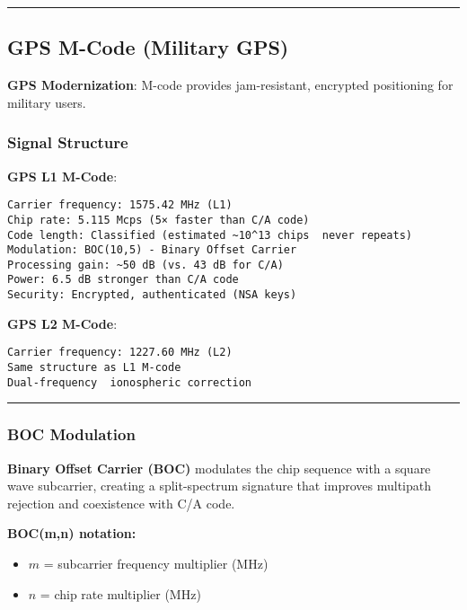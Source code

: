 \begin{center}\rule{0.5\linewidth}{0.5pt}\end{center}

\subsection{\texorpdfstring{ GPS M-Code (Military
GPS)}{ GPS M-Code (Military GPS)}}\label{gps-m-code-military-gps}

\textbf{GPS Modernization}: M-code provides jam-resistant, encrypted
positioning for military users.

\subsubsection{Signal Structure}\label{signal-structure}

\textbf{GPS L1 M-Code}:

\begin{verbatim}
Carrier frequency: 1575.42 MHz (L1)
Chip rate: 5.115 Mcps (5× faster than C/A code)
Code length: Classified (estimated ~10^13 chips  never repeats)
Modulation: BOC(10,5) - Binary Offset Carrier
Processing gain: ~50 dB (vs. 43 dB for C/A)
Power: 6.5 dB stronger than C/A code
Security: Encrypted, authenticated (NSA keys)
\end{verbatim}

\textbf{GPS L2 M-Code}:

\begin{verbatim}
Carrier frequency: 1227.60 MHz (L2)
Same structure as L1 M-code
Dual-frequency  ionospheric correction
\end{verbatim}

\begin{center}\rule{0.5\linewidth}{0.5pt}\end{center}

\subsubsection{BOC Modulation}\label{boc-modulation}

\textbf{Binary Offset Carrier (BOC)} modulates the chip sequence with a square wave subcarrier, creating a split-spectrum signature that improves multipath rejection and coexistence with C/A code.

\textbf{BOC(m,n) notation:}
\begin{itemize}
\item $m$ = subcarrier frequency multiplier (MHz)
\item $n$ = chip rate multiplier (MHz)
\end{itemize}


